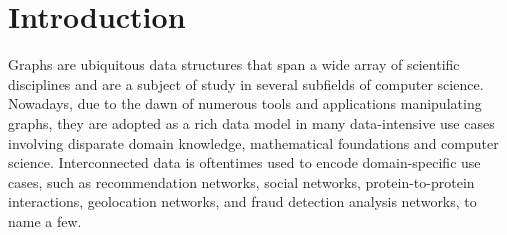 \section{Introduction}
\label{sec:intro}



Graphs are ubiquitous data structures that span a wide array of scientific disciplines
and are a subject of study in several subfields of computer science.
Nowadays, due to the dawn of numerous tools and applications manipulating
graphs, they are adopted as a rich data model in many data-intensive use
cases involving disparate domain knowledge, mathematical foundations and
computer science. Interconnected data is oftentimes used to encode domain-specific
use cases, such as recommendation networks, social networks,
protein-to-protein interactions, geolocation networks, and fraud detection analysis networks, to
name a few.

